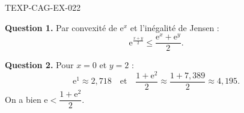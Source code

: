 \begin{corrige}{TEXP-CAG-EX-022}

\textbf{Question 1.} Par convexité de $\mathrm{e}^x$ et l'inégalité de Jensen :
\[ \mathrm{e}^{\frac{x+y}{2}} \leq \frac{\mathrm{e}^x + \mathrm{e}^y}{2}. \]


\textbf{Question 2.} Pour $x=0$ et $y=2$ :
\[ \mathrm{e}^{1} \approx 2{,}718 \quad \text{et} \quad \frac{1 + \mathrm{e}^2}{2} \approx \frac{1 + 7{,}389}{2} \approx 4{,}195. \]
On a bien $\mathrm{e} < \dfrac{1 + \mathrm{e}^2}{2}$.

\end{corrige}
